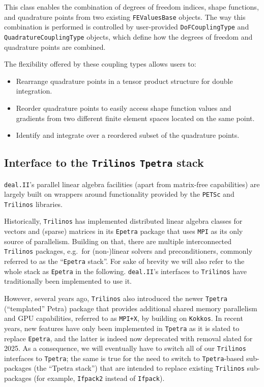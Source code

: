 \documentclass{ansarticle-preprint}
\newcommand{\specialword}[1]{\texttt{#1}}
\newcommand{\dealii}{{\specialword{deal.II}}\xspace}
\newcommand{\trilinos}{{\specialword{Trilinos}}\xspace}
\newcommand{\petsc}{\specialword{PETSc}\xspace}
\newcommand{\MPI}{{\specialword{MPI}}\xspace}
\newcommand{\MPIx}{{\specialword{MPI+X}}\xspace}
\newcommand{\kokkos}{{\specialword{Kokkos}}\xspace}
\newcommand{\epetra}{{\specialword{Epetra}}\xspace}
\newcommand{\tpetra}{{\specialword{Tpetra}}\xspace}
\begin{document}
\begin{itemize}
This class enables the combination of degrees of freedom indices, shape
functions, and quadrature points from two existing \texttt{FEValuesBase}
objects. The way this combination is performed is controlled by user-provided
\texttt{DoFCouplingType} and \texttt{QuadratureCouplingType} objects, which
define how the degrees of freedom and quadrature points are combined.

The flexibility offered by these coupling types allows users to:

\begin{itemize}
 \item Rearrange quadrature points in a tensor product structure for double
integration.
\item Reorder quadrature points to easily access shape function values and
gradients from two different finite element spaces located on the same point.
\item Identify and integrate over a reordered subset of the quadrature points.
\end{itemize}
\end{itemize}

\subsection{Interface to the \trilinos{} \tpetra{} stack}\label{sec:tpetra}

\dealii{}'s parallel linear algebra facilities (apart from matrix-free capabilities) are largely built on
wrappers around functionality provided by the \petsc{} and \trilinos{} libraries.

Historically, \trilinos{} has implemented distributed linear algebra classes for vectors and (sparse) matrices in its
\epetra{} package that uses \MPI{} as its only source of
parallelism. Building on that, there are multiple interconnected \trilinos{} packages, e.g.\ for (non-)linear solvers 
and preconditioners, commonly referred to as the 
``\epetra{} stack''. For sake of brevity we will also refer to the whole stack as \epetra{} in the following.
\dealii{}'s interfaces to \trilinos{} have traditionally 
been implemented to use it.

However, several years ago, \trilinos{} also introduced the
newer \tpetra{} (``templated'' Petra) package that provides additional shared memory
parallelism and GPU capabilities, referred to as \MPIx, by building on \kokkos{}. 
In recent years, new features have only been implemented in \tpetra{} as 
it is slated to replace \epetra{}, and the latter is indeed
now deprecated with removal slated for 2025. 
As a consequence, 
we will eventually have to switch all of our \trilinos{} interfaces to \tpetra{}; 
the same is true for the need to switch to \tpetra{}-based
sub-packages (the ``Tpetra stack'') that are intended to replace existing \trilinos{} sub-packages 
(for example, \texttt{Ifpack2} instead of \texttt{Ifpack}).
\end{document}
